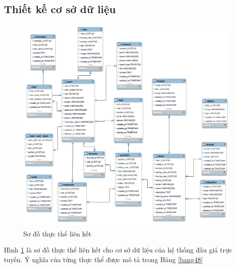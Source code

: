 \documentclass[../DoAn.tex]{subfiles}
\begin{document}
\subsection{Thiết kế cơ sở dữ liệu}
\begin{figure}[H]
    \centering
    \includegraphics[width=11.4cm,height=11.0cm]{Hinhve/database.png}
    \caption{Sơ đồ thực thể liên kết}
    \label{fig:Fig413}
\end{figure}
Hình \ref{fig:Fig413} là sơ đồ thực thể liên kết cho cơ sở dữ liệu của hệ thống đấu giá trực tuyến. Ý nghĩa của từng thực thể được mô tả trong Bảng  \ref{bang48}
    \tabletail{\hline}
    \label{bang48}
\end{document}
